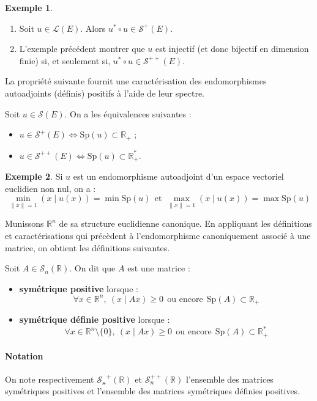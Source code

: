 \documentclass[french]{article}
\newcommand{\R}{\mathbb{R}}
\newcommand{\st}{^*}
\theoremstyle{plain}
\theoremstyle{definition}
\newtheorem*{ex}{Exemple}
\theoremstyle{remark}
\begin{document}
\begin{ex}
	\begin{enumerate}
		\item Soit $u\in\mathcal{L}(E)$. Alors $u\st\circ u\in\mathcal{S}^+(E)$.
		\item L'exemple précédent montrer que $u$ est injectif (et donc bijectif en dimension finie) si, et seulement si, $u\st\circ u\in\mathcal{S}^{++}(E)$.
	\end{enumerate}
\end{ex}

La propriété suivante fournit une caractérisation des endomorphismes autoadjoints (définis) positifs à l'aide de leur spectre.

\begin{thm}{}
	Soit $u\in\mathcal{S}(E)$. On a les équivalences suivantes : 
	\begin{itemize}
		\item $u\in\mathcal{S}^+(E)\iff \text{Sp}(u)\subset\R_+$ ;
		\item $u\in\mathcal{S}^{++}(E)\iff \text{Sp}(u)\subset\R_+\st$.
	\end{itemize}
\end{thm}

\begin{ex}
	Si $u$ est un endomorphisme autoadjoint d'un espace vectoriel euclidien non nul, on a : $$\underset{\lVert x\rVert=1}{\min}(x\mid u(x))=\min\text{Sp}(u)\ \ \text{et}\ \ \underset{\lVert x\rVert=1}{\max}(x\mid u(x))=\max\text{Sp}(u)$$
\end{ex}

Munissons $\R^n$ de sa structure euclidienne canonique. En appliquant les définitions et caractérisations qui précèdent à l'endomorphisme canoniquement associé à une matrice, on obtient les définitions suivantes.

\begin{dfn}
	Soit $A\in\mathcal{S}_n(\R)$. On dit que $A$ est une matrice :
	\begin{itemize}
		\item \textbf{symétrique positive} lorsque : $$\forall x\in\R^n,\ (x\mid Ax)\geqslant 0\ \ \text{ou encore}\ \ \text{Sp}(A)\subset\R_+$$
		\item \textbf{symétrique définie positive} lorsque : $$\forall x\in\R^n\setminus\{0\},\ (x\mid Ax)\geqslant 0\ \ \text{ou encore}\ \ \text{Sp}(A)\subset\R_+\st$$
	\end{itemize}
\end{dfn}

\paragraph{Notation} On note respectivement $\mathcal{S_n}^+(\R)$ et $\mathcal{S}_n^{++}(\R)$ l'ensemble des matrices symétriques positives et l'ensemble des matrices symétriques définies positives.
\end{document}
